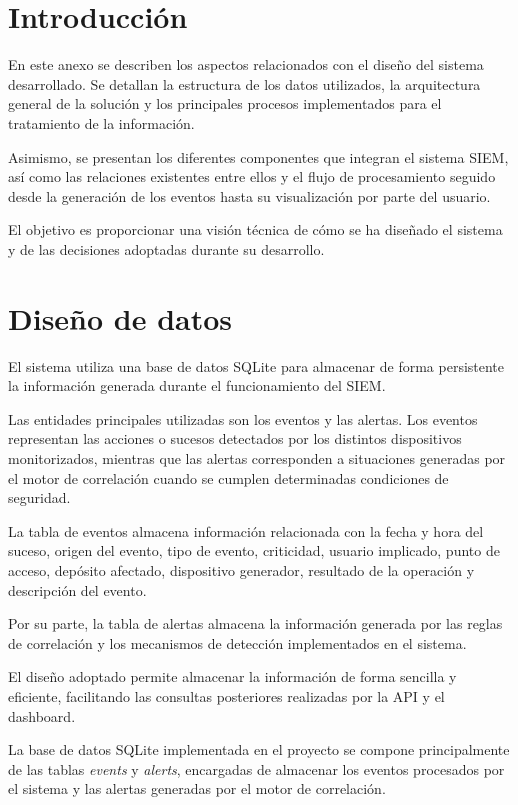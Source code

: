 
\section{Introducción}

En este anexo se describen los aspectos relacionados con el diseño del sistema desarrollado. Se detallan la estructura de los datos utilizados, la arquitectura general de la solución y los principales procesos implementados para el tratamiento de la información.

Asimismo, se presentan los diferentes componentes que integran el sistema SIEM, así como las relaciones existentes entre ellos y el flujo de procesamiento seguido desde la generación de los eventos hasta su visualización por parte del usuario.

El objetivo es proporcionar una visión técnica de cómo se ha diseñado el sistema y de las decisiones adoptadas durante su desarrollo.

\section{Diseño de datos}
El sistema utiliza una base de datos SQLite para almacenar de forma persistente la información generada durante el funcionamiento del SIEM.

Las entidades principales utilizadas son los eventos y las alertas. Los eventos representan las acciones o sucesos detectados por los distintos dispositivos monitorizados, mientras que las alertas corresponden a situaciones generadas por el motor de correlación cuando se cumplen determinadas condiciones de seguridad.

La tabla de eventos almacena información relacionada con la fecha y hora del suceso, origen del evento, tipo de evento, criticidad, usuario implicado, punto de acceso, depósito afectado, dispositivo generador, resultado de la operación y descripción del evento.

Por su parte, la tabla de alertas almacena la información generada por las reglas de correlación y los mecanismos de detección implementados en el sistema.

El diseño adoptado permite almacenar la información de forma sencilla y eficiente, facilitando las consultas posteriores realizadas por la API y el dashboard.

La base de datos SQLite implementada en el proyecto se compone principalmente de las tablas \textit{events} y \textit{alerts}, encargadas de almacenar los eventos procesados por el sistema y las alertas generadas por el motor de correlación.

